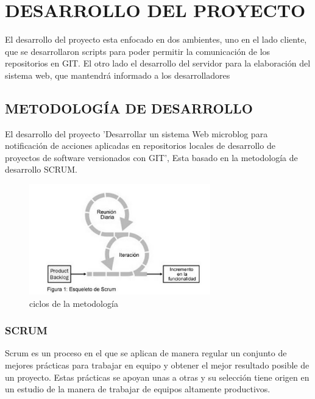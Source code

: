 

%
\chapter{DESARROLLO DEL PROYECTO}
El desarrollo del proyecto esta enfocado en dos ambientes, uno en el lado cliente, que se desarrollaron scripts para poder permitir la comunicación de los repositorios en GIT.
El otro lado el desarrollo del servidor para la elaboración del sistema web, que mantendrá informado a los desarrolladores
\section{METODOLOGÍA DE DESARROLLO}
El desarrollo del proyecto 'Desarrollar un sistema Web microblog para notificación de acciones aplicadas en repositorios locales de desarrollo de proyectos de software versionados con GIT', Esta basado en la metodología de desarrollo SCRUM.

\begin{figure}[htb]
\centering
\includegraphics[width=0.7\textwidth]{imagenes/image-0.png}%
\caption{ciclos de la metodología}
\label{contexto:figura}
\end{figure}

\subsection{SCRUM}
Scrum es un proceso en el que se aplican de manera regular un conjunto de mejores prácticas para trabajar en equipo y obtener el mejor resultado posible de un proyecto. Estas prácticas se apoyan unas a otras y su selección tiene origen en un estudio de la manera de trabajar de equipos altamente productivos.\\

